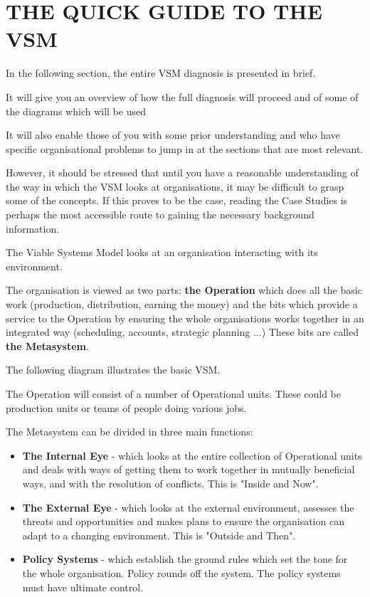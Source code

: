 \chapter{THE QUICK GUIDE TO THE VSM}\label{THE QUICK GUIDE TO THE VSM}
In the following section, the entire VSM diagnosis is presented in brief.

It will give you an overview of how the full diagnosis will proceed and of some of the diagrams which will be used

It will also enable those of you with some prior understanding and who have specific organisational problems to jump in at the sections that are most relevant.

However, it should be stressed that until you have a reasonable understanding of the way in which the VSM looks at organisations, it may be difficult to grasp some of the concepts. If this proves to be the case, reading the Case Studies is perhaps the most accessible route to gaining the necessary background information.

The Viable Systems Model looks at an organisation interacting with its environment.

The organisation is viewed as two parts: \textbf{the Operation} which does all the basic work (production, distribution, earning the money) and the bits which provide a service to the Operation by ensuring the whole organisations works together in an integrated way (scheduling, accounts, strategic planning ...) These bits are called \textbf{the Metasystem}.

The following diagram illustrates the basic VSM.

The Operation will consist of a number of Operational units. These could be production units or teams of people doing various jobs.

The Metasystem can be divided in three main functions:

\begin{itemize}
  \item \textbf{The Internal Eye} - which looks at the entire collection of Operational units and deals with ways of getting them to work together in mutually beneficial ways, and with the resolution of conflicts. This is "Inside and Now".

  \item \textbf{The External Eye} - which looks at the external environment, assesses the threats and opportunities and makes plans to ensure the organisation can adapt to a changing environment. This is "Outside and Then".

  \item \textbf{Policy Systems} - which establish the ground rules which set the tone for the whole organisation. Policy rounds off the system. The policy systems must have ultimate control.

\end{itemize}

